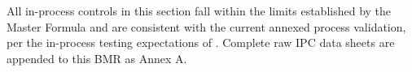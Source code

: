 \begin{tcolorbox}[infobox]
\small All in-process controls in this section fall within the limits established by the
Master Formula and are consistent with the current annexed process validation, per the
in-process testing expectations of \citep{ich_q7,who_trs986}. Complete raw IPC data sheets
are appended to this BMR as Annex A.
\end{tcolorbox}
